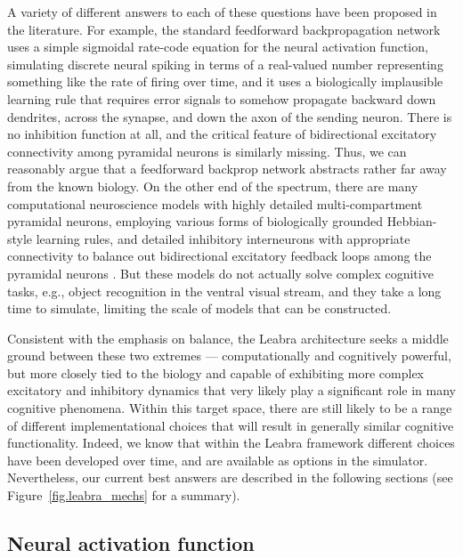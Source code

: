 \documentclass[11pt,twoside]{article}
\begin{document}
A variety of different answers to each of these questions have been proposed in the literature.  For example, the standard feedforward backpropagation network uses a simple sigmoidal rate-code equation for the neural activation function, simulating discrete neural spiking in terms of a real-valued number representing something like the rate of firing over time, and it uses a biologically implausible learning rule that requires error signals to somehow propagate backward down dendrites, across the synapse, and down the axon of the sending neuron.  There is no inhibition function at all, and the critical feature of bidirectional excitatory connectivity among pyramidal neurons is similarly missing.  Thus, we can reasonably argue that a feedforward backprop network abstracts rather far away from the known biology.  On the other end of the spectrum, there are many computational neuroscience models with highly detailed multi-compartment pyramidal neurons, employing various forms of biologically grounded Hebbian-style learning rules, and detailed inhibitory interneurons with appropriate connectivity to balance out bidirectional excitatory feedback loops among the pyramidal neurons \cite{biodetrefs}.  But these models do not actually solve complex cognitive tasks, e.g., object recognition in the ventral visual stream, and they take a long time to simulate, limiting the scale of models that can be constructed.

Consistent with the emphasis on balance, the Leabra architecture seeks a middle ground between these two extremes --- computationally and cognitively powerful, but more closely tied to the biology and capable of exhibiting more complex excitatory and inhibitory dynamics that very likely play a significant role in many cognitive phenomena.  Within this target space, there are still likely to be a range of different implementational choices that will result in generally similar cognitive functionality.  Indeed, we know that within the Leabra framework different choices have been developed over time, and are available as options in the simulator.  Nevertheless, our current best answers are described in the following sections (see Figure~\ref{fig.leabra_mechs} for a summary).

\subsection{Neural activation function}
\end{document}
